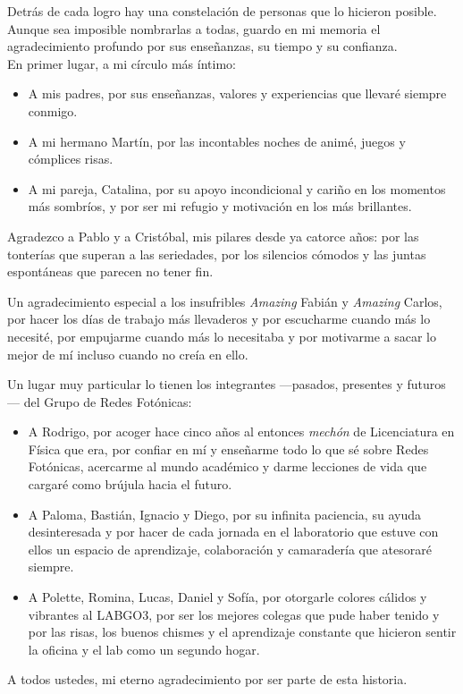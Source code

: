 \documentclass[hyphens]{umemoria}
\begin{document}
\begin{thanks}
Detrás de cada logro hay una constelación de personas que lo hicieron posible. Aunque sea imposible nombrarlas a todas, guardo en mi memoria el agradecimiento profundo por sus enseñanzas, su tiempo y su confianza. \\

En primer lugar, a mi círculo más íntimo:
\begin{itemize}
\item A mis padres, por sus enseñanzas, valores y experiencias que llevaré siempre conmigo.
\item A mi hermano Martín, por las incontables noches de animé, juegos y cómplices risas.
\item A mi pareja, Catalina, por su apoyo incondicional y cariño en los momentos más sombríos, y por ser mi refugio y motivación en los más brillantes.
\end{itemize}
Agradezco a Pablo y a Cristóbal, mis pilares desde ya catorce años: por las tonterías que superan a las seriedades, por los silencios cómodos y las juntas espontáneas que parecen no tener fin. 

Un agradecimiento especial a los insufribles \textit{Amazing} Fabián y \textit{Amazing} Carlos, por hacer los días de trabajo más llevaderos y por escucharme cuando más lo necesité, por empujarme cuando más lo necesitaba y por motivarme a sacar lo mejor de mí incluso cuando no creía en ello.

Un lugar muy particular lo tienen los integrantes —pasados, presentes y futuros— del Grupo de Redes Fotónicas:
\begin{itemize}
\item A Rodrigo, por acoger hace cinco años al entonces \textit{mechón} de Licenciatura en Física que era, por confiar en mí y enseñarme todo lo que sé sobre Redes Fotónicas, acercarme al mundo académico y darme lecciones de vida que cargaré como brújula hacia el futuro.
\item A Paloma, Bastián, Ignacio y Diego, por su infinita paciencia, su ayuda desinteresada y por hacer de cada jornada en el laboratorio que estuve con ellos un espacio de aprendizaje, colaboración y camaradería que atesoraré siempre.
\item A Polette, Romina, Lucas, Daniel y Sofía, por otorgarle colores cálidos y vibrantes al LABGO3, por ser los mejores colegas que pude haber tenido y por las risas, los buenos chismes y el aprendizaje constante que hicieron sentir la oficina y el lab como un segundo hogar.
\end{itemize}
A todos ustedes, mi eterno agradecimiento por ser parte de esta historia.
\end{thanks}
\end{document}
